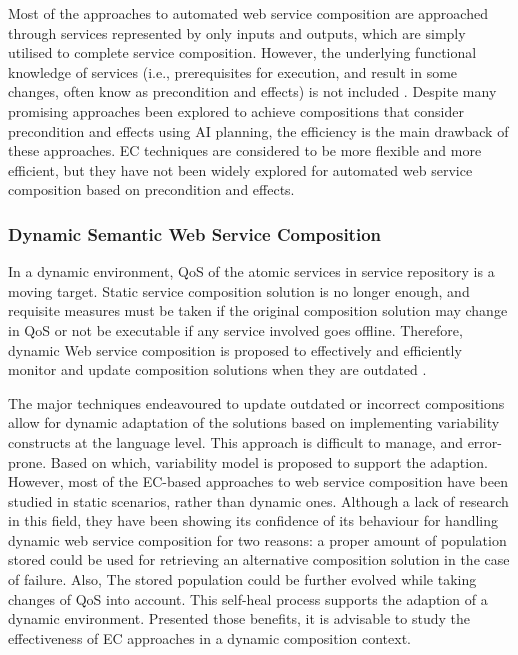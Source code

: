 Most of the approaches to automated web service composition are approached through services represented by only inputs and outputs, which are simply utilised to complete service composition. However, the underlying functional knowledge of services (i.e., prerequisites for execution, and result in some changes, often know as precondition and effects) is not included \cite{paliwal2012semantics}. Despite many promising approaches \cite{DBLP:journals/soca/BoustilMS14} been explored to achieve compositions that consider precondition and effects using AI planning, the efficiency is the main drawback of these approaches. EC techniques are considered to be more flexible and more efficient, but they have not been widely explored for automated web service composition based on precondition and effects.

\subsubsection{Dynamic Semantic Web Service Composition}
In a  dynamic environment, QoS of the atomic services in service repository is a moving target. Static service composition solution is no longer enough, and requisite measures must be taken if the original composition solution may change in QoS or not be executable if any service involved goes offline. Therefore, dynamic Web service composition is proposed to effectively and efficiently monitor and update composition solutions when they are outdated \cite{li2014fault}. 


The major techniques endeavoured to update outdated or incorrect compositions allow for dynamic adaptation of the solutions based on implementing variability constructs at the language level. This approach is difficult to manage, and error-prone.  Based on which, variability model \cite{alferez2014dynamic} is proposed to support the adaption. However, most of the EC-based approaches to web service composition have been studied in static scenarios, rather than dynamic ones. Although a lack of research in this field, they have been showing its confidence of its behaviour for handling dynamic web service composition for two reasons: a proper amount of population stored could be used for retrieving an alternative composition solution in the case of failure. Also, The stored population could be further evolved while taking changes of QoS into account. This self-heal process supports the adaption of a dynamic environment. Presented those benefits, it is advisable to study the effectiveness of EC approaches in a dynamic composition context.






